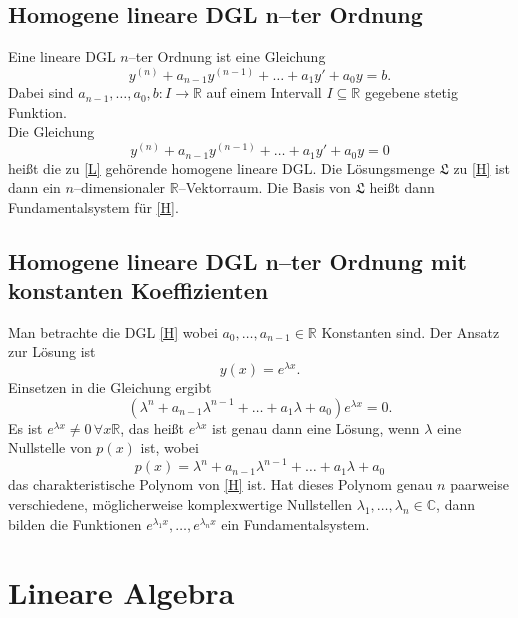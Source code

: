\documentclass[a4paper,12pt]{article}
\numberwithin{equation}{section}
\begin{document}
\subsection{Homogene lineare DGL n--ter Ordnung}
Eine lineare DGL $n$--ter Ordnung ist eine Gleichung
\[ 
        y^{\left(n\right)}+a_{n-1}y^{\left(n-1\right)}+\hdots +a_1y'+a_0y=b \tag{L}\label{L} %
.\] 
Dabei sind $a_{n-1},\hdots ,a_0,b:I\rightarrow \mathbb{R}$ auf einem Intervall $I\subseteq \mathbb{R}$ gegebene stetig Funktion.\\
Die Gleichung
\[ 
        y^{\left(n\right)}+a_{n-1}y^{\left(n-1\right)}+\hdots +a_1y'+a_0y=0\tag{H}\label{H} %
\] 
heißt die zu \eqref{L} gehörende homogene lineare DGL. Die Lösungsmenge $\mathfrak{L}$ zu \eqref{H} ist dann ein $n$--dimensionaler $\mathbb{R}$--Vektorraum. Die Basis von $\mathfrak{L}$ heißt dann Fundamentalsystem für \eqref{H}.

\subsection{Homogene lineare DGL n--ter Ordnung mit konstanten Koeffizienten}
Man betrachte die DGL \eqref{H} wobei $a_0,\hdots ,a_{n-1} \in \mathbb{R}$ Konstanten sind. Der Ansatz zur Lösung ist 
\[ 
        y\left(x\right)=e^{\lambda x}
.\] 
Einsetzen in die Gleichung ergibt
\[ 
        \left(\lambda ^{n}+a_{n-1}\lambda ^{n-1}+\hdots +a_1\lambda +a_0\right)e^{\lambda x}=0
.\] 
Es ist $e^{\lambda x}\neq 0\,\forall x\mathbb{R}$, das heißt $e^{\lambda x}$ ist genau dann eine Lösung, wenn $\lambda $ eine Nullstelle von $p\left(x\right)$ ist, wobei
\[ 
        p\left(x\right)=\lambda ^n+a_{n-1}\lambda ^{n-1}+\hdots +a_1\lambda +a_0
\] 
das charakteristische Polynom von \eqref{H} ist. Hat dieses Polynom genau $n$ paarweise verschiedene, möglicherweise komplexwertige Nullstellen $\lambda _1,\hdots ,\lambda _n  \in \mathbb{C}$, dann bilden die Funktionen $e^{\lambda _1x},\hdots ,e^{\lambda _nx}$ ein Fundamentalsystem. 


\section*{Lineare Algebra}
\end{document}
